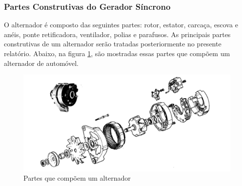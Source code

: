 \subsubsection{Partes Construtivas do Gerador Síncrono}
\label{construtivas-gerador-sincrono}

O alternador é composto das seguintes partes: rotor, estator, carcaça, escova e anéis, ponte retificadora, ventilador, polias e parafusos. As principais partes construtivas de um alternador serão tratadas posteriormente no presente relatório.
Abaixo, na figura \ref{partes-alternador}, são mostradas essas partes que compõem um alternador de automóvel.


\begin{figure}[h]
	\centering
	\includegraphics[scale=1]		{figuras/partes_alternador.png}
	\caption{Partes que compõem um alternador}
	\label{partes-alternador}
\end{figure}

